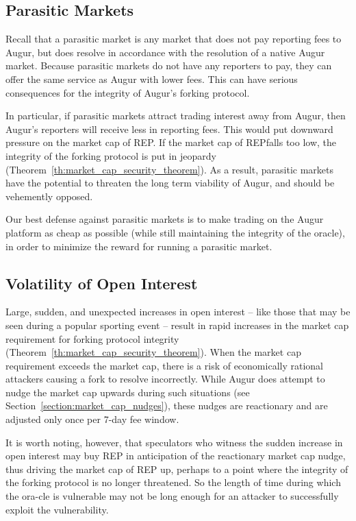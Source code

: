 \documentclass[12pt,floatfix,reprint,nofootinbib,amsmath,amssymb,epsfig,pre,floats,letterpaper,groupedaffiliation]{revtex4-1}
\theoremstyle{definition}
\theoremstyle{definition}
\begin{document}
\subsection{Parasitic Markets}

Recall that a parasitic market is any market that does not pay reporting fees to Augur, but does resolve in accordance with the resolution of a native Augur market. Because parasitic markets do not have any reporters to pay, they can offer the same service as Augur with lower fees. This can have serious consequences for the integrity of Augur's forking protocol.

In particular, if parasitic markets attract trading inter\-est away from Augur, then Augur's reporters will receive less in reporting fees. This would put downward pressure on the market cap of REP. If the market cap of REP\linebreak falls too low, the integrity of the forking protocol is put in jeopardy (Theorem~\ref{th:market_cap_security_theorem}). As a result, parasitic markets have the potential to threaten the long term viability of Augur, and should be vehemently opposed.

Our best defense against parasitic markets is to make trading on the Augur platform as cheap as possible (while still maintaining the integrity of the oracle), in order to minimize the reward for running a parasitic market.

\subsection{Volatility of Open Interest}

Large, sudden, and unexpected increases in open in\-terest -- like those that may be seen during a popular sporting event -- result in rapid increases in the market cap requirement for forking protocol integrity (Theorem\linebreak ~\ref{th:market_cap_security_theorem}). When the market cap requirement exceeds the mar\-ket cap, there is a risk of economically rational attackers causing a fork to resolve incorrectly. While Augur does attempt to nudge the market cap upwards during such situations (see Section~\ref{section:market_cap_nudges}), these nudges are reactionary and are adjusted only once per 7-day fee window.

It is worth noting, however, that speculators who wit\-ness the sudden increase in open interest may buy REP in anticipation of the reactionary market cap nudge, thus driving the market cap of REP up, perhaps to a point where the integrity of the forking protocol is no longer threatened. So the length of time during which the ora-\linebreak cle is vulnerable may not be long enough for an attacker to successfully exploit the vulnerability.
\end{document}
